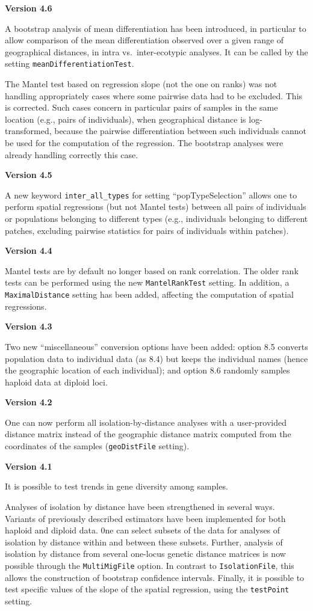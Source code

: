 \documentclass[
  12pt,
]{book}
\begin{document}
\textbf{Version 4.6}

A bootstrap analysis of mean differentiation has been introduced, in particular to allow comparison of the mean differentiation observed over a given range of geographical distances, in intra vs.~inter-ecotypic analyses. It can be called by the setting \texttt{meanDifferentiationTest}.

The Mantel test based on regression slope (not the one on ranks) was not handling appropriately cases where some pairwise data had to be excluded. This is corrected. Such cases concern in particular pairs of samples in the same location (e.g., pairs of individuals), when geographical distance is log-transformed, because the pairwise differentiation between such individuals cannot be used for the computation of the regression. The bootstrap analyses were already handling correctly this case.

\textbf{Version 4.5}

A new keyword \texttt{inter\_all\_types} for setting ``popTypeSelection'' allows one to perform spatial regressions (but not Mantel tests) between all pairs of individuals or populations belonging to different types (e.g., individuals belonging to different patches, excluding pairwise statistics for pairs of individuals within patches).

\textbf{Version 4.4}

Mantel tests are by default no longer based on rank correlation. The older rank tests can be performed using the new \texttt{MantelRankTest} setting. In addition, a \texttt{MaximalDistance} setting has been added, affecting the computation of spatial regressions.

\textbf{Version 4.3}

Two new ``miscellaneous'' conversion options have been added: option 8.5 converts population data to individual data (as 8.4) but keeps the individual names (hence the geographic location of each individual); and option 8.6 randomly samples haploid data at diploid loci.

\textbf{Version 4.2}

One can now perform all isolation-by-distance analyses with a user-provided distance matrix instead of the geographic distance matrix computed from the coordinates of the samples (\texttt{geoDistFile} setting).

\textbf{Version 4.1}

It is possible to test trends in gene diversity among samples.

Analyses of isolation by distance have been strengthened in several ways. Variants of previously described estimators have been implemented for both haploid and diploid data. 0ne can select subsets of the data for analyses of isolation by distance within and between these subsets. Further, analysis of isolation by distance from several one-locus genetic distance matrices is now possible through the \texttt{MultiMigFile}
option. In contrast to \texttt{IsolationFile}, this allows the construction of bootstrap confidence intervals. Finally, it is possible to test specific values of the slope of the spatial regression, using the \texttt{testPoint} setting.
\end{document}
